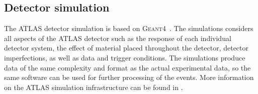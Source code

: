 

\subsection{Detector simulation}
The ATLAS detector simulation is based on \textsc{Geant4}~\cite{Agostinelli:2002hh}.
The simulations considers all aspects of the ATLAS detector such as the response of each individual detector system, the effect of material placed throughout the detector, detector imperfections, as well as data and trigger conditions.
The simulations produce data of the same complexity and format as the actual experimental data, so the same software can be used for further processing of the events.
More information on the ATLAS simulation infrastructure can be found in .


